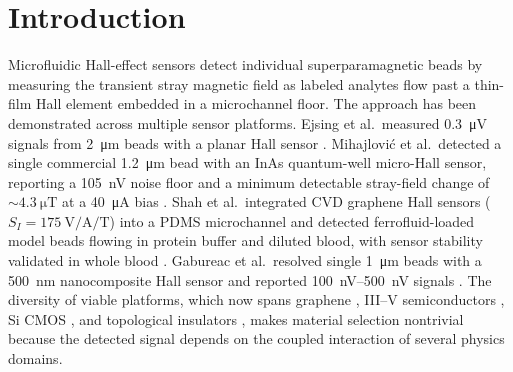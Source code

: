 \documentclass[micromachines,article,submit,pdftex,moreauthors]{Definitions/mdpi}
\begin{document}
\section{Introduction}
\label{sec:intro}

Microfluidic Hall-effect sensors detect individual superparamagnetic beads by
measuring the transient stray magnetic field as labeled analytes flow past a
thin-film Hall element embedded in a microchannel floor. The approach has been
demonstrated across multiple sensor platforms. Ejsing et al.\ measured
\SI{0.3}{\micro\volt} signals from \SI{2}{\micro\meter} beads with a planar Hall
sensor \cite{ejsing2004}. Mihajlovi\'{c} et al.\ detected a single commercial
\SI{1.2}{\micro\meter} bead with an InAs quantum-well micro-Hall sensor, reporting
a \SI{105}{\nano\volt} noise floor and a minimum detectable stray-field change of
${\sim}\SI{4.3}{\micro\tesla}$ at a \SI{40}{\micro\ampere} bias \cite{mihajlovic2005}.
Shah et al.\ integrated CVD graphene Hall sensors
($S_I = \SI{175}{\volt\per\ampere\per\tesla}$) into a PDMS microchannel and
detected ferrofluid-loaded model beads flowing in protein buffer and diluted
blood, with sensor stability validated in whole blood \cite{shah2023}. Gabureac et al.\ resolved single
\SI{1}{\micro\meter} beads with a \SI{500}{\nano\meter} nanocomposite Hall sensor
and reported \SIrange{100}{500}{\nano\volt} signals \cite{gabureac2013}. The
diversity of viable platforms, which now spans graphene
\cite{dauber2015,kaidarova2021}, III--V semiconductors
\cite{mihajlovic2005,gilbertson2011}, Si CMOS \cite{besse2002}, and topological
insulators \cite{saeed2024}, makes material selection nontrivial because the
detected signal depends on the coupled interaction of several physics domains.
\end{document}
